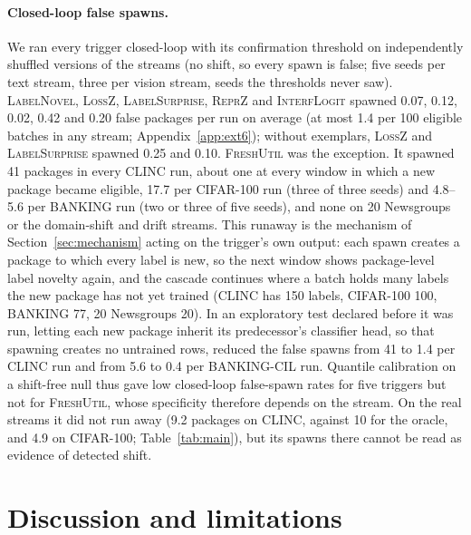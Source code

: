\documentclass[10pt]{article}
\newcommand{\ls}{\textsc{LabelSurprise}}
\begin{document}
\paragraph{Closed-loop false spawns.} We ran every trigger closed-loop with its confirmation threshold on independently shuffled versions of the streams (no shift, so every spawn is false; five seeds per text stream, three per vision stream, seeds the thresholds never saw). \textsc{LabelNovel}, \textsc{LossZ}, \ls{}, \textsc{ReprZ} and \textsc{InterfLogit} spawned 0.07, 0.12, 0.02, 0.42 and 0.20 false packages per run on average (at most 1.4 per 100 eligible batches in any stream; Appendix~\ref{app:ext6}); without exemplars, \textsc{LossZ} and \ls{} spawned 0.25 and 0.10. \textsc{FreshUtil} was the exception. It spawned 41 packages in every CLINC run, about one at every window in which a new package became eligible, 17.7 per CIFAR-100 run (three of three seeds) and 4.8--5.6 per BANKING run (two or three of five seeds), and none on 20 Newsgroups or the domain-shift and drift streams. This runaway is the mechanism of Section~\ref{sec:mechanism} acting on the trigger's own output: each spawn creates a package to which every label is new, so the next window shows package-level label novelty again, and the cascade continues where a batch holds many labels the new package has not yet trained (CLINC has 150 labels, CIFAR-100 100, BANKING 77, 20 Newsgroups 20). In an exploratory test declared before it was run, letting each new package inherit its predecessor's classifier head, so that spawning creates no untrained rows, reduced the false spawns from 41 to 1.4 per CLINC run and from 5.6 to 0.4 per BANKING-CIL run. Quantile calibration on a shift-free null thus gave low closed-loop false-spawn rates for five triggers but not for \textsc{FreshUtil}, whose specificity therefore depends on the stream. On the real streams it did not run away (9.2 packages on CLINC, against 10 for the oracle, and 4.9 on CIFAR-100; Table~\ref{tab:main}), but its spawns there cannot be read as evidence of detected shift.

\section{Discussion and limitations}
\end{document}
